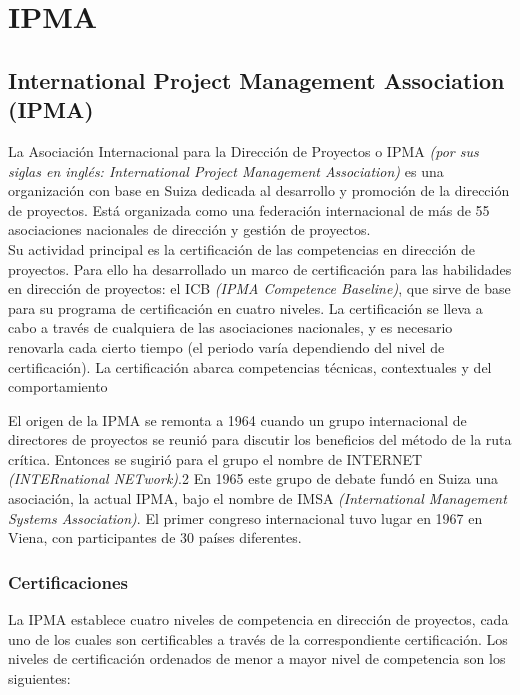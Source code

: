 \section{IPMA}

\subsection{International Project Management Association (IPMA)}

La Asociación Internacional para la Dirección de Proyectos o IPMA \emph{(por sus siglas en inglés: International Project Management Association)} es una organización con base en Suiza dedicada al desarrollo y promoción de la dirección de proyectos. Está organizada como una federación internacional de más de 55 asociaciones nacionales de dirección y gestión de proyectos.\\

Su actividad principal es la certificación de las competencias en dirección de proyectos. Para ello ha desarrollado un marco de certificación para las habilidades en dirección de proyectos: el ICB \emph{(IPMA Competence Baseline)}, que sirve de base para su programa de certificación en cuatro niveles. La certificación se lleva a cabo a través de cualquiera de las asociaciones nacionales, y es necesario renovarla cada cierto tiempo (el periodo varía dependiendo del nivel de certificación). La certificación abarca competencias técnicas, contextuales y del comportamiento

El origen de la IPMA se remonta a 1964 cuando un grupo internacional de directores de proyectos se reunió para discutir los beneficios del método de la ruta crítica. Entonces se sugirió para el grupo el nombre de INTERNET \emph{(INTERnational NETwork)}.2 En 1965 este grupo de debate fundó en Suiza una asociación, la actual IPMA, bajo el nombre de IMSA \emph{(International Management Systems Association)}. El primer congreso internacional tuvo lugar en 1967 en Viena, con participantes de 30 países diferentes.

\subsubsection{Certificaciones}

La IPMA establece cuatro niveles de competencia en dirección de proyectos, cada uno de los cuales son certificables a través de la correspondiente certificación. Los niveles de certificación ordenados de menor a mayor nivel de competencia son los siguientes:\\

